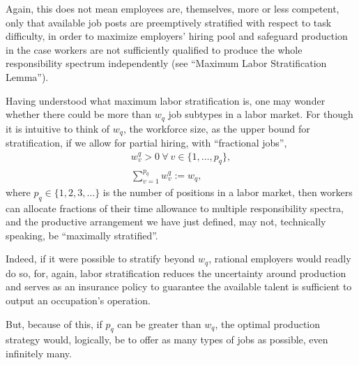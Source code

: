 \documentclass[hidelinks, nonatbib]{elsarticle}
\begin{document}
\begin{definition}
    Again, this does not mean employees are, themselves, more or less competent, only that available job posts are preemptively stratified with respect to task difficulty, in order to maximize employers' hiring pool and safeguard production in the case workers are not sufficiently qualified to produce the whole responsibility spectrum independently (see ``Maximum Labor Stratification Lemma'').    
\end{definition}
Having understood what maximum labor stratification is, one may wonder whether there could be more than $w_q$ job subtypes in a labor market. For though it is intuitive to think of $w_q$, the workforce size, as the upper bound for stratification, if we allow for partial hiring, with ``fractional jobs'',
\begin{gather}
w_{v}^{q} 
> 0
\
\forall
\
v \in \{1, \dots, p_q\}
,
\\
\sum_{v=1}^{p_q}
w_{v}^{q}
:=
w_q
,
\end{gather}
where $p_q \in \{1, 2, 3, \dots\}$ is the number of positions in a labor market, then workers can allocate fractions of their time allowance to multiple responsibility spectra, and the productive arrangement we have just defined, may not, technically speaking, be ``maximally stratified''. 

Indeed, if it were possible to stratify beyond $w_q$, rational employers would readly do so, for, again, labor stratification reduces the uncertainty around production and serves as an insurance policy to guarantee the available talent is sufficient to output an occupation's operation.

But, because of this, if $p_q$ can be greater than $w_q$, the optimal production strategy would, logically, be to offer as many types of jobs as possible, even infinitely many.
\end{document}
